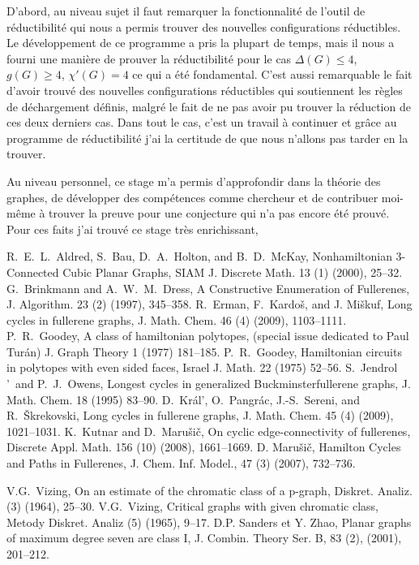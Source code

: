 \documentclass[10pt,a4paper]{article}
\begin{document}
D'abord, au niveau sujet il faut remarquer la fonctionnalité de l'outil de réductibilité qui nous a permis trouver des nouvelles configurations réductibles. Le développement de ce programme a pris la plupart de temps, mais il nous a fourni une manière de prouver la réductibilité pour le cas $\Delta(G) \leq 4$, $g(G) \geq 4$, $\chi'(G)=4$ ce qui a été fondamental. C'est aussi remarquable le fait d'avoir trouvé des nouvelles configurations réductibles qui soutiennent les règles de déchargement définis, malgré le fait de ne pas avoir pu trouver la réduction de ces deux derniers cas. Dans tout le cas, c'est un travail à continuer et grâce au programme de réductibilité j'ai la certitude de que nous n'allons pas tarder en la trouver. 

Au niveau personnel, ce stage m'a permis d'approfondir dans la théorie des graphes, de développer des compétences comme chercheur et de contribuer moi-même à trouver la preuve pour une conjecture qui n'a pas encore été prouvé. Pour ces faits j'ai trouvé ce stage très enrichissant, 

\begin{thebibliography}{99}
 R.~E.~L.~Aldred, S.~Bau, D.~A.~Holton, and B.~D.~McKay,	
Nonhamiltonian 3-Connected Cubic Planar Graphs,
SIAM J. Discrete Math. 13 (1) (2000), 25--32.
 G.~Brinkmann and A.~W.~M.~Dress, A Constructive Enumeration of Fullerenes, J. Algorithm. 23 (2) (1997), 345--358.
 R.~Erman, F.~Kardo\v s, and J. Mi\v skuf, Long cycles in fullerene graphs, J. Math. Chem. 46 (4) (2009), 1103--1111.
 P.~R.~Goodey, A class of hamiltonian polytopes, (special issue dedicated to Paul Tur\'{a}n) J. Graph Theory 1 (1977) 181--185.
 P.~R.~Goodey, Hamiltonian circuits in polytopes with even sided faces, Israel J. Math. 22 (1975) 52--56.
 S.~Jendrol$\!$'~and P.~J.~Owens, {Longest cycles in generalized Buckminsterfullerene graphs}, J. Math. Chem. {18} (1995) 83--90.
 D.~Kr\'al$\!$', O.~Pangr\'ac, J.-S.~Sereni, and R.~\v Skrekovski, Long cycles in fullerene graphs, J. Math. Chem. 45 (4) (2009), 1021--1031.
 K.~Kutnar and D.~Maru\v si\v c, On cyclic edge-connectivity of fullerenes, Discrete Appl. Math. 156 (10) (2008), 1661--1669.
 D. Maru\v si\v c, {Hamilton Cycles and Paths in Fullerenes}, J. Chem. Inf. Model., {47} (3) (2007), 732--736. 

 V.G.~Vizing, On an estimate of the chromatic class of a p-graph, Diskret. Analiz. (3) (1964), 25--30.
 V.G.~Vizing, Critical graphs with given chromatic class, Metody Diskret. Analiz (5) (1965), 9--17.
 D.P. Sanders et Y. Zhao, Planar graphs of maximum degree seven are class I, J. Combin. Theory Ser. B, {83} (2), (2001), 201--212.
\end{thebibliography}
\end{document}
